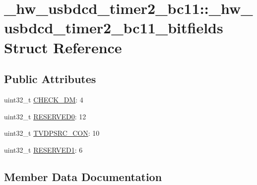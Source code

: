 \hypertarget{struct__hw__usbdcd__timer2__bc11_1_1__hw__usbdcd__timer2__bc11__bitfields}{}\section{\+\_\+hw\+\_\+usbdcd\+\_\+timer2\+\_\+bc11\+:\+:\+\_\+hw\+\_\+usbdcd\+\_\+timer2\+\_\+bc11\+\_\+bitfields Struct Reference}
\label{struct__hw__usbdcd__timer2__bc11_1_1__hw__usbdcd__timer2__bc11__bitfields}
\subsection*{Public Attributes}
\begin{DoxyCompactItemize}
\item 
uint32\+\_\+t \hyperlink{struct__hw__usbdcd__timer2__bc11_1_1__hw__usbdcd__timer2__bc11__bitfields_a82a2e4d9d256785c977973c5c01d5bad}{C\+H\+E\+C\+K\+\_\+\+DM}\+: 4
\item 
uint32\+\_\+t \hyperlink{struct__hw__usbdcd__timer2__bc11_1_1__hw__usbdcd__timer2__bc11__bitfields_a1036f4805cb524569cd4c77b907c8b2e}{R\+E\+S\+E\+R\+V\+E\+D0}\+: 12
\item 
uint32\+\_\+t \hyperlink{struct__hw__usbdcd__timer2__bc11_1_1__hw__usbdcd__timer2__bc11__bitfields_a0aff47fbb895264ad00acb80f42dea59}{T\+V\+D\+P\+S\+R\+C\+\_\+\+C\+ON}\+: 10
\item 
uint32\+\_\+t \hyperlink{struct__hw__usbdcd__timer2__bc11_1_1__hw__usbdcd__timer2__bc11__bitfields_aba66d54c42da7f6144fd1c8a4b75dc95}{R\+E\+S\+E\+R\+V\+E\+D1}\+: 6
\end{DoxyCompactItemize}


\subsection{Member Data Documentation}
